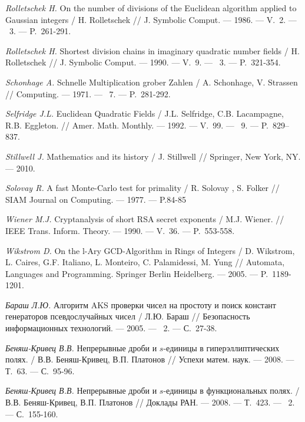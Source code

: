 \begin{thebibliography}{99}
    \textit{Rolletschek H.} On the number of divisions of the Euclidean algorithm applied to Gaussian integers / H. Rolletschek // J. Symbolic Comput. --- 1986. --- V.~2. --- \textnumero~3. --- P.~261-291.
    
    \textit{Rolletschek H.} Shortest division chains in imaginary quadratic number fields / H. Rolletschek // J. Symbolic Comput. --- 1990. --- V.~9. --- {\textnumero}~3. --- P.~321-354.

    \textit{Schonhage A.} Schnelle Multiplication grober Zahlen / A. Schonhage, V. Strassen // Computing. --- 1971. --- {\textnumero}~7. --- P.~281-292.

    \textit{Selfridge J.L.} Euclidean Quadratic Fields / J.L. Selfridge, C.B. Lacampagne, R.B. Eggleton. // Amer. Math. Monthly. --- 1992. --- V.~99. --- {\textnumero}~9. --- P.~829--837.

    \textit{Stillwell J.} Mathematics and its history / J. Stillwell // Springer, New York, NY. --- 2010.

    \textit{Solovay R.} A fast Monte-Carlo test for primality / R. Solovay , S. Folker // SIAM Journal on Computing. --- 1977. --- P.84-85
    
    \textit{Wiener M.J.} Cryptanalysis of short RSA secret exponents / M.J. Wiener. // IEEE Trans. Inform. Theory. --- 1990. --- V.~36. --- P.~553-558.

    \textit{Wikstrom D.} On the l-Ary GCD-Algorithm in Rings of Integers / D. Wikstrom, L. Caires, G.F. Italiano, L. Monteiro, C. Palamidessi, M. Yung // Automata, Languages and Programming. Springer Berlin Heidelberg. --- 2005. --- P.~1189-1201.

    \textit{Бараш Л.Ю.} Алгоритм AKS проверки чисел на простоту и поиск констант генераторов псевдослучайных чисел / Л.Ю. Бараш // Безопасность информационных технологий. --- 2005. --- \textnumero~2. --- С.~27-38.

    \textit{Беняш-Кривец В.В.} Непрерывные дроби и $s$-единицы в гиперэллиптических полях. / В.В. Беняш-Кривец, В.П. Платонов // Успехи матем. наук. --- 2008. --- Т.~63. --- С.~95-96.
    
    \textit{Беняш-Кривец В.В.} Непрерывные дроби и $s$-единицы в функциональных полях. / В.В. Беняш-Кривец, В.П. Платонов // Доклады РАН. --- 2008. --- Т.~423. --- \textnumero~2. --- С.~155-160.


\end{thebibliography}

